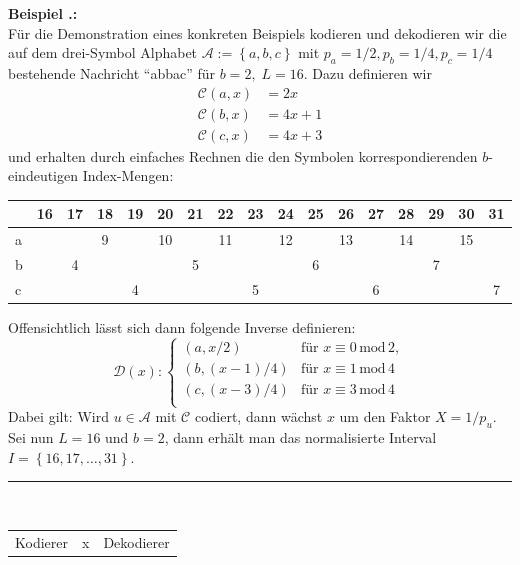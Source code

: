 \documentclass[a4paper,12pt]{article}
\newcommand{\A}{\mathcal A}
\newcommand{\C}{\mathcal C}
\newcommand{\D}{\mathcal D}
\newcounter{Beispiel}
\newenvironment{Beispiel}{
\medskip
        
        \setlength{\parindent}{0pt}
        \addtocounter{Beispiel}{1}
        \textbf{\textsf{Beispiel \thesubsection.\theBeispiel}:}\\}{
        \nopagebreak
        \vspace{-1.0ex}
        \bigskip
        
}
\begin{document}
\begin{Beispiel}
Für die Demonstration eines konkreten Beispiels kodieren und dekodieren wir die auf dem drei-Symbol Alphabet  $\A :=\left\{a, b, c\right\}$    mit $p_a=1 /2, p_b = 1/4, p_c = 1/4$ bestehende Nachricht "`abbac"' für $b=2,\;L=16$. Dazu definieren wir
\begin{align*}
\C(a,x)&=2 x
\\
\C(b,x) &= 4 x + 1
\\
\C(c,x) &= 4 x + 3
\end{align*}
und erhalten durch einfaches Rechnen die den Symbolen korrespondierenden $b$-eindeutigen Index-Mengen:
\par
\vspace{0.5cm}
\begin{center}
 \begin{tabular}{l|c|c|c|c|c|c|c|c|c|c|c|c|c|c|c|c}
 & 16 & 17 & 18 & 19 & 20 & 21 & 22 & 23 & 24 & 25 & 26 & 27 & 28 & 29 & 30 &31\\
\hline
a	& \centering 8 & & 9 & & 10	& & 11 & & 12 & & 13 & & 14 & & 15 &	\\
\hline
b	&  & 4 &  & & 	& 5 &  & &  & 6 &  & &  & 7 & 	\\
\hline
c	&  & &  & 4& 	&  &  &  5&  &  &  & 6 &  &  & & 7 	\\
\end{tabular}
\end{center}
\vspace{0.5cm}
Offensichtlich lässt sich dann folgende Inverse definieren:
$$
\D(x):
               \begin{cases}
                 \left(a,x / 2 \right)         & \text{für}\,\, x \equiv 0 \,\text{mod}\, 2,\\
                    \left(b,(x-1)/ 4\right)           & \text{für}\,\, x \equiv 1 \,\text{mod}\, 4\\
									\left(c, (x-3)/ 4 \right)          & \text{für}\,\, x \equiv 3 \,\text{mod}\, 4\\
                \end{cases}
$$
Dabei gilt: Wird $u\in\A$ mit $\C$ codiert, dann wächst $x$ um den Faktor $X = 1 / p_u$. Sei nun $L=16$ und $b=2$, dann erhält man das normalisierte Interval $I=\left\{16, 17,\ldots,31\right\}$.
\newpage
\begin{center}
{\color{gray!50!blue}\rule{8cm}{0.5mm}}
\\
\begin{tabular}{c c c}
Kodierer & x & Dekodierer
\end{tabular}

\end{center}
\end{Beispiel}
\end{document}
